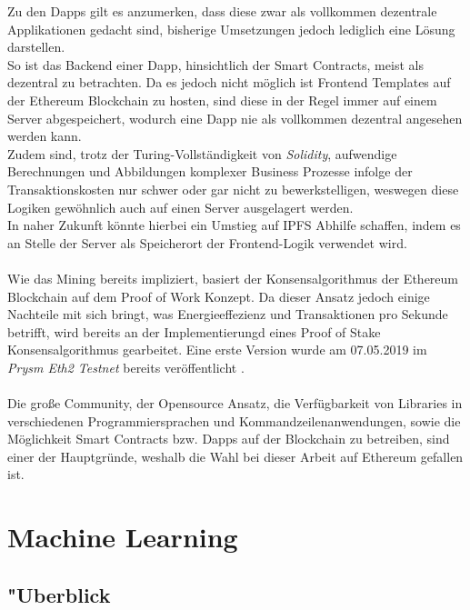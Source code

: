 Zu den Dapps gilt es anzumerken, dass diese zwar als vollkommen dezentrale Applikationen gedacht sind, bisherige Umsetzungen jedoch lediglich eine  Lösung darstellen. \\
So ist das Backend einer Dapp, hinsichtlich der Smart Contracts, meist als dezentral zu betrachten. Da es jedoch nicht möglich ist Frontend Templates auf der Ethereum Blockchain zu hosten, sind diese in der Regel immer auf einem Server abgespeichert, wodurch eine Dapp nie als vollkommen dezentral angesehen werden kann. \\
Zudem sind, trotz der Turing-Vollständigkeit von \textit{Solidity}, aufwendige Berechnungen und Abbildungen komplexer Business Prozesse infolge der Transaktionskosten nur schwer oder gar nicht zu bewerkstelligen, weswegen diese Logiken gewöhnlich auch auf einen Server ausgelagert werden.\\
In naher Zukunft könnte hierbei ein Umstieg auf IPFS Abhilfe schaffen, indem es an Stelle der Server als Speicherort der Frontend-Logik verwendet wird.  \\\\
Wie das Mining bereits impliziert, basiert der Konsensalgorithmus der Ethereum Blockchain auf dem Proof of Work Konzept. Da dieser Ansatz jedoch einige Nachteile mit sich bringt, was Energieeffezienz und Transaktionen pro Sekunde betrifft, wird bereits an der Implementierungd eines Proof of Stake Konsensalgorithmus gearbeitet. Eine erste Version wurde am 07.05.2019 im \textit{Prysm Eth2 Testnet} bereits veröffentlicht \cite{ETH20:PRYSM}. \\\\
Die große Community, der Opensource Ansatz, die Verfügbarkeit von Libraries in verschiedenen Programmiersprachen und Kommandzeilenanwendungen, sowie die Möglichkeit Smart Contracts bzw. Dapps auf der Blockchain zu betreiben, sind einer der Hauptgründe, weshalb die Wahl bei dieser Arbeit auf Ethereum gefallen ist.   
\cite{BitcoinEthNCo,DL:bafin,Antonopoulos:2017:MBP:3164842}

\clearpage
\section{Machine Learning}
\subsection{"Uberblick}

